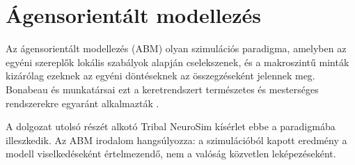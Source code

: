 \section{Ágensorientált modellezés}

Az ágensorientált modellezés (ABM) olyan szimulációs paradigma, amelyben az egyéni szereplők lokális szabályok alapján cselekszenek, és a makroszintű minták kizárólag ezeknek az egyéni döntéseknek az összegzéseként jelennek meg. Bonabeau és munkatársai ezt a keretrendszert természetes és mesterséges rendszerekre egyaránt alkalmazták \cite{bonabeau2002}.

A dolgozat utolsó részét alkotó Tribal NeuroSim kísérlet ebbe a paradigmába illeszkedik. Az ABM irodalom hangsúlyozza: a szimulációból kapott eredmény a modell viselkedéseként értelmezendő, nem a valóság közvetlen leképezéseként.
